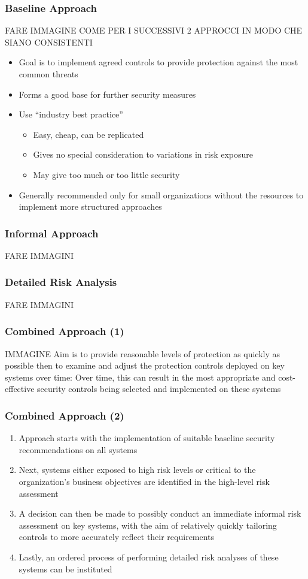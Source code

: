 \documentclass[xcolor ={table,usenames,dvipsnames}]{beamer}
\theoremstyle{definition}
\begin{document}
		
	\begin{frame}
		\frametitle{Baseline Approach}
			FARE IMMAGINE COME PER I SUCCESSIVI 2 APPROCCI IN MODO CHE SIANO CONSISTENTI
			\begin{itemize} 
				\item Goal is to implement agreed controls to provide protection against the most common threats
				\item Forms a good base for further security measures
				\item Use “industry best practice”
				\begin{itemize}
					\item Easy, cheap, can be replicated
					\item Gives no special consideration to variations in risk exposure
					\item May give too much or too little security
				\end{itemize}
				\item Generally recommended only for small organizations without the resources to implement more structured approaches
			\end{itemize}
	\end{frame}
	
	\begin{frame}
		\frametitle{Informal Approach}
		FARE IMMAGINI 
	\end{frame}

	\begin{frame}
		\frametitle{Detailed Risk Analysis}
		FARE IMMAGINI
	\end{frame}

	\begin{frame}
		\frametitle{Combined Approach (1)}
		IMMAGINE 
		 Aim is to provide reasonable levels of protection as quickly as possible then to examine and adjust the protection controls deployed on key systems over time:
		Over time, this can result in the most appropriate and cost-effective security controls being selected and implemented on these systems
	\end{frame}
	
	\begin{frame}
		\frametitle{Combined Approach (2)}
		\begin{enumerate}
			\item Approach starts with the implementation of suitable baseline security recommendations on all systems
			\item Next, systems either exposed to high risk levels or critical to the organization's business objectives are identified in the high-level risk assessment
			\item A decision can then be made to possibly conduct an immediate informal risk assessment on key systems, with the aim of relatively quickly tailoring controls to more accurately reflect their requirements
			\item Lastly, an ordered process of performing detailed risk analyses of these systems can be instituted
		\end{enumerate}
	\end{frame}
\end{document}
